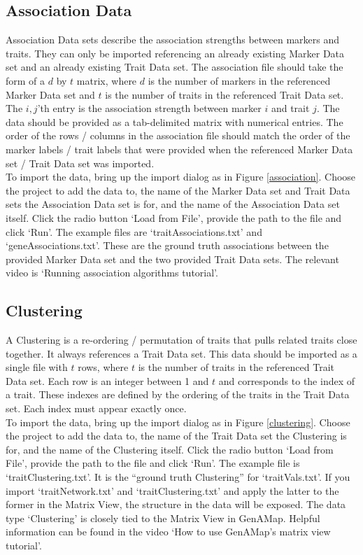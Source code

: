 \documentclass{article}
\begin{document}
\subsection{Association Data}

Association Data sets describe the association strengths between markers and traits. They can only be imported referencing an already existing Marker Data set and an already existing Trait Data set. The association file should take the form of a $d$ by $t$ matrix, where $d$ is the number of markers in the referenced Marker Data set and $t$ is the number of traits in the referenced Trait Data set. The $i,j$'th entry is the association strength between marker $i$ and trait $j$. The data should be provided as a tab-delimited matrix with numerical entries. The order of the rows / columns in the association file should match the order of the marker labels / trait labels that were provided when the referenced Marker Data set / Trait Data set was imported.\\

To import the data, bring up the import dialog as in Figure \ref{association}. Choose the project to add the data to, the name of the Marker Data set and Trait Data sets the Association Data set is for, and the name of the Association Data set itself. Click the radio button `Load from File', provide the path to the file and click `Run'. The example files are `traitAssociations.txt' and `geneAssociations.txt'. These are the ground truth associations between the provided Marker Data set and the two provided Trait Data sets. The relevant video is `Running association algorithms tutorial'.

\subsection{Clustering}

A Clustering is a re-ordering / permutation of traits that pulls related traits close together. It always references a Trait Data set. This data should be imported as a single file with $t$ rows, where $t$ is the number of traits in the referenced Trait Data set. Each row is an integer between 1 and $t$ and corresponds to the index of a trait. These indexes are defined by the ordering of the traits in the Trait Data set. Each index must appear exactly once.\\

To import the data, bring up the import dialog as in Figure \ref{clustering}. Choose the project to add the data to, the name of the Trait Data set the Clustering is for, and the name of the Clustering itself. Click the radio button `Load from File', provide the path to the file and click `Run'. The example file is `traitClustering.txt'. It is the ``ground truth Clustering'' for `traitVals.txt'. If you import `traitNetwork.txt' and `traitClustering.txt' and apply the latter to the former in the Matrix View, the structure in the data will be exposed. The data type `Clustering' is closely tied to the Matrix View in GenAMap. Helpful information can be found in the video `How to use GenAMap's matrix view tutorial'.
\end{document}
